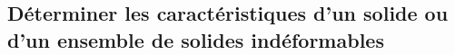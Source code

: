 \subsection{Déterminer les caractéristiques d'un solide ou d'un ensemble de solides indéformables}

\renewcommand{\repExo}{../../ExercicesCompetences/B2_ProposerModele/B2_10_CartacteristiquesSolides}

\renewcommand{\td}{40_Parallelepipede}
\graphicspath{{\repStyle/png/}{\repExo/\td/images/}}


\renewcommand{\td}{41_Parallelepipede}
\graphicspath{{\repStyle/png/}{\repExo/\td/images/}}


\renewcommand{\td}{42_Cylindre}
\graphicspath{{\repStyle/png/}{\repExo/\td/images/}}


\renewcommand{\td}{43_Cylindre}
\graphicspath{{\repStyle/png/}{\repExo/\td/images/}}


\renewcommand{\td}{44_Disque}
\graphicspath{{\repStyle/png/}{\repExo/\td/images/}}


\renewcommand{\td}{45_Disque}
\graphicspath{{\repStyle/png/}{\repExo/\td/images/}}
